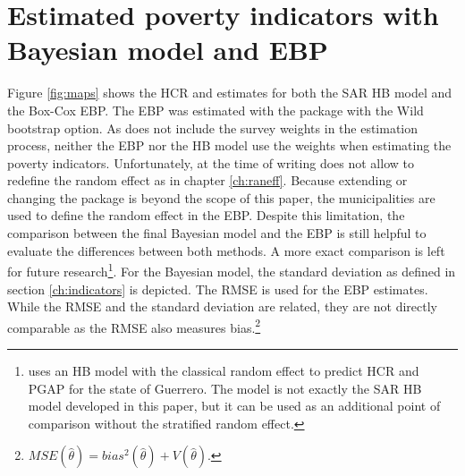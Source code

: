 \section{Estimated poverty indicators with Bayesian model and EBP}
Figure \ref{fig:maps} shows the HCR and estimates for both the SAR HB model and the Box-Cox EBP.
The EBP was estimated with the  package \citep{kreutzmann_r_2019} with the Wild bootstrap option.
As  does not include the survey weights in the estimation process, neither the EBP nor the HB model use the weights when estimating the poverty indicators.
Unfortunately, at the time of writing  does not allow to redefine the random effect as in chapter \ref{ch:raneff}.
Because extending or changing the  package is beyond the scope of this paper, the municipalities are used to define the random effect in the EBP.
Despite this limitation, the comparison between the final Bayesian model and the EBP is still helpful to evaluate the differences between both methods.
A more exact comparison is left for future research\footnote{\cite{morelli_hierarchical_2021} uses an HB model with the classical random effect to predict HCR and PGAP for the state of Guerrero. The model is not exactly the SAR HB model developed in this paper, but it can be used as an additional point of comparison without the stratified random effect.}.
For the Bayesian model, the standard deviation as defined in section \ref{ch:indicators} is depicted.
The RMSE is used for the EBP estimates.
While the RMSE and the standard deviation are related, they are not directly comparable as the RMSE also measures bias.\footnote{$MSE(\hat \theta) = bias^2(\hat \theta) + V(\hat \theta).$}



